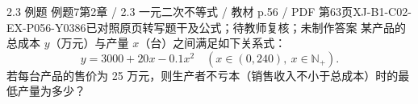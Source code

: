 \par\noindent\begin{minipage}{\linewidth}
\begin{bankitem}{2.3 例题 例题7}{第2章 / 2.3 一元二次不等式 / 教材 p.56 / PDF 第63页}{XJ-B1-C02-EX-P056-Y0386}{已对照原页转写题干及公式；待教师复核；未制作答案}
某产品的总成本 $y$（万元）与产量 $x$（台）之间满足如下关系式：
\[y=3000+20x-0.1x^2\quad(x\in(0,240),\ x\in\mathbb N_+).\]
若每台产品的售价为 25 万元，则生产者不亏本（销售收入不小于总成本）时的最低产量为多少？
\end{bankitem}
\end{minipage}\par\medskip
